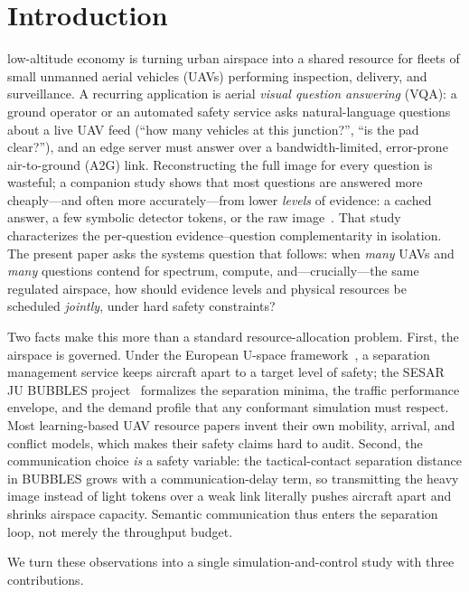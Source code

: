 \section{Introduction}\label{sec:intro}

 low-altitude economy is turning urban airspace into a
shared resource for fleets of small unmanned aerial vehicles (UAVs)
performing inspection, delivery, and surveillance. A recurring application
is aerial \emph{visual question answering} (VQA): a ground operator or an
automated safety service asks natural-language questions about a live
UAV feed (``how many vehicles at this junction?'', ``is the pad clear?''),
and an edge server must answer over a bandwidth-limited, error-prone
air-to-ground (A2G) link. Reconstructing the full image for every question
is wasteful; a companion study shows that most questions are answered more
cheaply---and often more accurately---from lower \emph{levels} of evidence:
a cached answer, a few symbolic detector tokens, or the raw
image~\cite{zhang2026askb4tx}. That study characterizes the
per-question evidence--question complementarity in isolation. The present
paper asks the systems question that follows: when \emph{many} UAVs and
\emph{many} questions contend for spectrum, compute, and---crucially---the
same regulated airspace, how should evidence levels and physical resources
be scheduled \emph{jointly}, under hard safety constraints?

Two facts make this more than a standard resource-allocation problem.
First, the airspace is governed. Under the European U-space
framework~\cite{eu2021664}, a separation management service keeps aircraft
apart to a target level of safety; the SESAR JU BUBBLES
project~\cite{bubbles2022d21} formalizes the separation minima, the traffic
performance envelope, and the demand profile that any conformant simulation
must respect. Most learning-based UAV resource papers invent their own
mobility, arrival, and conflict models, which makes their safety claims
hard to audit. Second, the communication choice \emph{is} a safety
variable: the tactical-contact separation distance in
BUBBLES grows with a communication-delay term, so transmitting the heavy
image instead of light tokens over a weak link literally pushes aircraft
apart and shrinks airspace capacity. Semantic communication thus enters
the separation loop, not merely the throughput budget.

We turn these observations into a single simulation-and-control study with
three contributions.

